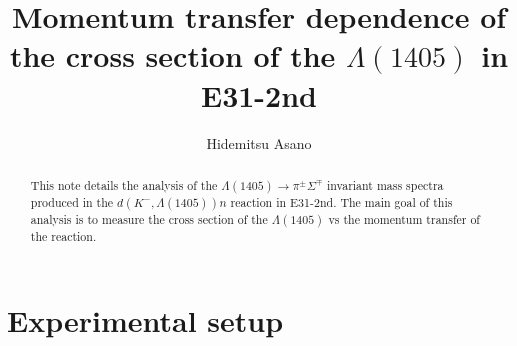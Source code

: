 \documentclass[a4paper]{article}
\title{Momentum transfer dependence of the cross section of the $\Lambda(1405)$ in E31-2nd }
\author{Hidemitsu Asano}
\date{}
\newcommand{\pS}{\mbox{$\pi^{\pm}\Sigma^{\mp}$}\xspace}
\begin{document}
\maketitle
\vspace{4em}
\begin{abstract}
\noindent This note details the analysis of the $\Lambda(1405)\rightarrow \pS $ invariant mass spectra produced in the $d(K^-,\Lambda(1405))n$ reaction in E31-2nd. The main goal of this analysis is to measure the cross section of the $\Lambda(1405)$ vs the momentum transfer of the reaction.
\end{abstract}
\tableofcontents

\clearpage
\listoffigures

\clearpage
\listoftables

\clearpage
{}




\section{Experimental setup}


















\begin{appendices}


\end{appendices}




\end{document}
